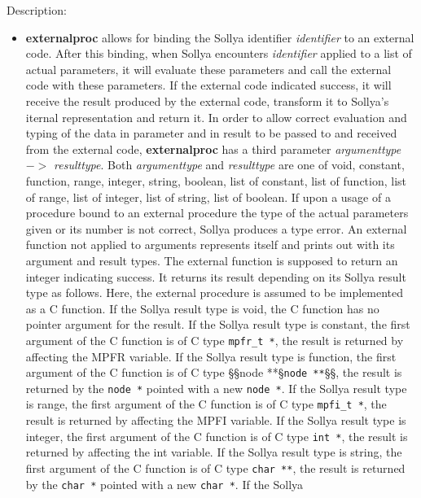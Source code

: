 \noindent Description: \begin{itemize}

\item \textbf{externalproc} allows for binding the Sollya identifier
   \emph{identifier} to an external code.  After this binding, when Sollya
   encounters \emph{identifier} applied to a list of actual parameters, it
   will evaluate these parameters and call the external code with these
   parameters. If the external code indicated success, it will receive
   the result produced by the external code, transform it to Sollya's
   iternal representation and return it.
   In order to allow correct evaluation and typing of the data in
   parameter and in result to be passed to and received from the external
   code, \textbf{externalproc} has a third parameter \emph{argumenttype} $->$ \emph{resulttype}.
   Both \emph{argumenttype} and \emph{resulttype} are one of void, constant,
   function, range, integer, string, boolean, list of constant, list of
   function, list of range, list of integer, list of string, list of
   boolean.
   If upon a usage of a procedure bound to an external procedure the type
   of the actual parameters given or its number is not correct, Sollya
   produces a type error. An external function not applied to arguments
   represents itself and prints out with its argument and result types.
   The external function is supposed to return an integer indicating
   success.  It returns its result depending on its Sollya result type
   as follows. Here, the external procedure is assumed to be implemented
   as a C function.
   If the Sollya result type is void, the C function has no pointer
   argument for the result.  If the Sollya result type is constant, the
   first argument of the C function is of C type \texttt{mpfr\_t *}, the result is
   returned by affecting the MPFR variable.  If the Sollya result type
   is function, the first argument of the C function is of C type §§node
   **§\texttt{node **}§§, the result is returned by the \texttt{node *} pointed with a new \texttt{node *}.
   If the Sollya result type is range, the first argument of the C
   function is of C type \texttt{mpfi\_t *}, the result is returned by affecting
   the MPFI variable.  If the Sollya result type is integer, the first
   argument of the C function is of C type \texttt{int *}, the result is returned
   by affecting the int variable.  If the Sollya result type is string,
   the first argument of the C function is of C type \texttt{char **}, the result
   is returned by the \texttt{char *} pointed with a new \texttt{char *}.  If the Sollya

\end{itemize}
